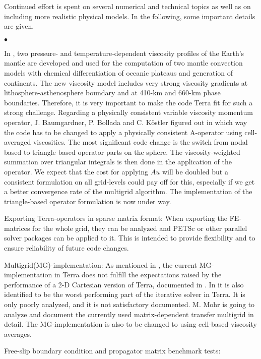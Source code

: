 \documentclass[twoside,10pt]{article}
\newenvironment{dlist}
   {\begin{list}
      {$\bullet$}
      {
      \setlength{\topsep}{0.5ex}
      \setlength{\partopsep}{0.0ex}
      \setlength{\parsep}{0.5ex}
      \setlength{\itemsep}{0.0ex}
      \setlength{\itemindent}{3.0ex}
      \setlength{\leftmargin}{0.0ex}
      \setlength{\labelsep}{1.0ex}
      }
   }
   {\end{list}}
\begin{document}
Continued effort is spent on several numerical and technical topics as well as on including more realistic physical models. 
In the following, some important details are given.
\begin{dlist}
  \item 
In \cite{Walzer2008a,Walzer2012,Walzer2012b}, two pressure- and temperature-dependent viscosity profiles of the Earth's mantle are developed and used for the computation of two mantle convection models with chemical differentiation of oceanic plateaus and generation of continents.
The new viscosity model includes very strong viscosity gradients at lithosphere-asthenosphere boundary and at 410-km and 660-km phase boundaries.
Therefore, it is very important to make the code Terra fit for such a strong challenge. 
Regarding a physically consistent variable viscosity momentum operator, J. Baumgardner, P. Bollada and C. K\"ostler figured out in which way the code has to be changed to apply a physically consistent A-operator using cell-averaged viscosities. 
The most significant code change is the switch from nodal based to triangle based operator parts on the sphere. 
The viscosity-weighted summation over triangular integrals is then done in the application of the operator. 
We expect that the cost for applying $Au$ will be doubled but a consistent formulation on all grid-levels could pay off for this, especially if we get a better convergence rate of the multigrid algorithm.
The implementation of the triangle-based operator formulation is now under way. 
 \item Exporting Terra-operators in sparse matrix format:
When exporting the FE-matrices for the whole grid, they can be analyzed and PETSc or other parallel solver packages can be applied to it. 
This is intended to provide flexibility and to ensure reliability of future code changes.
 \item Multigrid(MG)-implementation: 
As mentioned in \cite{Tackley2008}, the current MG-implementation in Terra does not fulfill the expectations raised by the performance of a 2-D Cartesian version of Terra, documented in \cite{Yang2000}. 
In \cite{Koestler2011} it is also identified to be the worst performing part of the iterative solver in Terra. 
It is only poorly analyzed, and it is not satisfactory documented. 
M. Mohr is going to analyze and document the currently used matrix-dependent transfer multigrid in detail.
The MG-implementation is also to be changed to using cell-based viscosity averages.
 \item Free-slip boundary condition and propagator matrix benchmark tests:

\end{dlist}
\end{document}
